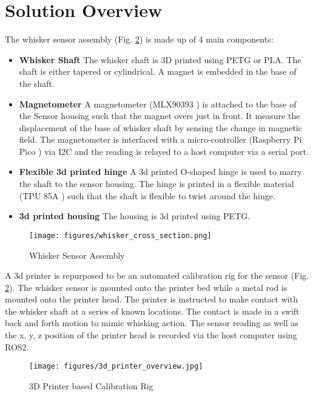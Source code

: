 \documentclass{report}
\begin{document}
\section{Solution Overview}

The whisker sensor assembly (Fig. \ref{fig:whisker_sensor}) is made up of 4 main components:
\begin{itemize}
    \item \textbf{Whisker Shaft} The whisker shaft is 3D printed using PETG or PLA. The shaft is either tapered or cylindrical. A magnet is embedded in the base of the shaft.
    \item \textbf{Magnetometer} A magnetometer (MLX90393 \cite{industriesAdafruitWideRangeTripleaxis}) is attached to the base of the Sensor housing such that the magnet overs just in front. It measure the displacement of the base of whisker shaft by sensing the change in magnetic field. The magnetometer is interfaced with a micro-controller (Raspberry Pi Pico \cite{ltdBuyRaspberryPi}) via I2C and the reading is relayed to a host computer via a serial port.
    \item \textbf{Flexible 3d printed hinge} A 3d printed O-shaped hinge is used to marry the shaft to the sensor housing. The hinge is printed in a flexible material (TPU 85A \cite{NinjaFlex85ATPU}) such that the shaft is flexible to twist around the hinge.
    \item \textbf{3d printed housing} The housing is 3d printed using PETG.
\end{itemize}

\begin{figure}[H]
    \centering
    \texttt{[image: figures/whisker\_cross\_section.png]}
    \caption{Whisker Sensor Assembly}
    \label{fig:whisker_sensor}
\end{figure}

A 3d printer is repurposed to be an automated calibration rig for the sensor (Fig. \ref{fig:whisker_sensor}). The whisker sensor is mounted onto the printer bed while a metal rod is mounted onto the printer head. The printer is instructed to make contact with the whisker shaft at a series of known locations. The contact is made in a swift back and forth motion to mimic whisking action. The sensor reading as well as the x, y, z position of the printer head is recorded via the host computer using ROS2.

\begin{figure}[H]
    \centering
    \texttt{[image: figures/3d\_printer\_overview.jpg]}
    \caption{3D Printer based Calibration Rig}
    \label{fig:whisker_sensor}
\end{figure}
\end{document}
